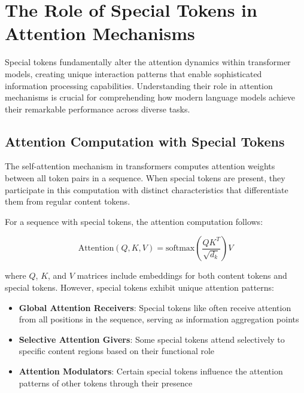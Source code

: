 \section{The Role of Special Tokens in Attention Mechanisms}

Special tokens fundamentally alter the attention dynamics within transformer models, creating unique interaction patterns that enable sophisticated information processing capabilities. Understanding their role in attention mechanisms is crucial for comprehending how modern language models achieve their remarkable performance across diverse tasks.
\begin{comment}
Feedback: This is a strong opening. To make it even more engaging, you could use a metaphor. For example: "If the attention mechanism is a conversation where every token talks to every other token, special tokens act as the moderators, the summarizers, and the topic managers. They don't just participate in the conversation; they shape its very structure."
\end{comment}

\subsection{Attention Computation with Special Tokens}

The self-attention mechanism in transformers computes attention weights between all token pairs in a sequence. When special tokens are present, they participate in this computation with distinct characteristics that differentiate them from regular content tokens.

For a sequence with special tokens, the attention computation follows:

\begin{equation}
\text{Attention}(Q, K, V) = \text{softmax}\left(\frac{QK^T}{\sqrt{d_k}}\right)V
\end{equation}

where $Q$, $K$, and $V$ matrices include embeddings for both content tokens and special tokens. However, special tokens exhibit unique attention patterns:

\begin{itemize}
\item \textbf{Global Attention Receivers}: Special tokens like \cls{} often receive attention from all positions in the sequence, serving as information aggregation points
\item \textbf{Selective Attention Givers}: Some special tokens attend selectively to specific content regions based on their functional role
\item \textbf{Attention Modulators}: Certain special tokens influence the attention patterns of other tokens through their presence
\end{itemize}


